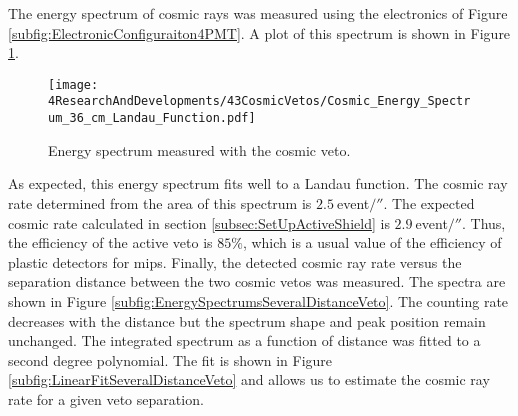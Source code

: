 The energy spectrum of cosmic rays was measured using the electronics of Figure \ref{subfig:ElectronicConfiguraiton4PMT}. A plot of this spectrum is shown in Figure \ref{fig:EnergySpectrumCosmicVeto}. 
\begin{figure}[h]
\centering
\texttt{[image: 4ResearchAndDevelopments/43CosmicVetos/Cosmic\_Energy\_Spectrum\_36\_cm\_Landau\_Function.pdf]}
\caption{Energy spectrum measured with the cosmic veto.\label{fig:EnergySpectrumCosmicVeto}}
\end{figure}
As expected, this energy spectrum fits well to a Landau function. The cosmic ray rate determined from the area of this spectrum is $2.5~$event$/\second$. The expected cosmic rate calculated in section \ref{subsec:SetUpActiveShield} is $2.9~$event$/\second$. Thus, the efficiency of the active veto is $85\%$, which is a usual value of the efficiency of plastic detectors for mips. Finally, the detected cosmic ray rate versus the separation distance between the two cosmic vetos was measured. The spectra are shown in Figure \ref{subfig:EnergySpectrumsSeveralDistanceVeto}. The counting rate decreases with the distance but the spectrum shape and peak position remain unchanged. The integrated spectrum as a function of distance was fitted to a second degree polynomial. The fit is shown in Figure \ref{subfig:LinearFitSeveralDistanceVeto} and allows us to estimate the cosmic ray rate for a given veto separation.





